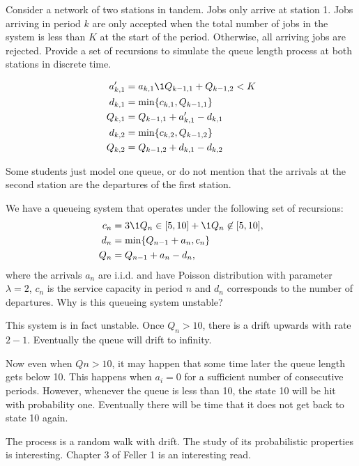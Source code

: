 \begin{exercise}[201807]{1}
Consider a network of two stations in tandem. Jobs only arrive at station 1. Jobs arriving in period $k$ are only accepted  when the total number of jobs in the system is less than $K$ at the start of the period. Otherwise, all arriving jobs are rejected. Provide a set of recursions to simulate the queue length process at  both stations in discrete time. 

\begin{solution}
  \begin{align*}
a_{k,1}' &= a_{k,1}\1{Q_{k-1, 1} + Q_{k-1,2} < K} \\
    d_{k,1} &= \min\{c_{k,1}, Q_{k-1, 1}\} \\
    Q_{k,1} &= Q_{k-1,1} + a_{k,1}' - d_{k,1}\\
    d_{k,2} &= \min\{c_{k,2}, Q_{k-1, 2}\} \\
    Q_{k,2} &= Q_{k-1,2} + d_{k,1} - d_{k,2}\\
  \end{align*}

Some students just model one queue, or do not mention that the arrivals at the second station are the departures of the first station.
\end{solution}
\end{exercise}


\begin{exercise}[201807]{1}
We have a queueing system that operates under the following set of recursions:
\begin{align*}
  c_n &= 3\1{Q_n \in [5, 10]} + \1{Q_n \not \in [5, 10]}, \\
d_n &= \min\{Q_{n-1}+a_n, c_n\} \\
Q_n &= Q_{n-1} + a_n - d_n,
\end{align*}
where the arrivals $a_n$ are i.i.d. and have Poisson distribution with parameter $\lambda=2$, $c_n$ is the service capacity in period $n$ and $d_n$ corresponds to the number of departures. Why is this queueing system unstable?
\begin{solution}
This system is in fact unstable. Once $Q_n > 10$, there is a drift upwards with rate $2-1$. Eventually the queue will drift to infinity. 

Now even when $Qn>10$, it may happen that some time later the queue length gets below 10. This happens when $a_i = 0$ for a sufficient number of consecutive periods. However, whenever the queue is less than 10, the state 10 will be hit with probability one. Eventually there will be time that it does not get back to state 10 again. 

The process is a random walk with drift. The study of its probabilistic properties is interesting. Chapter 3 of Feller 1 is an interesting read. 
\end{solution}
\end{exercise}


